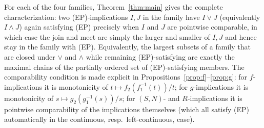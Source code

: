 \documentclass{amsart}
\theoremstyle{plain}
\theoremstyle{definition}
\begin{document}
For each of the four families, Theorem~\ref{thm:main} gives the complete characterization:
two (EP)-implications $I,J$ in the family have $I\vee J$ (equivalently $I\wedge J$) again
satisfying (EP) precisely when $I$ and $J$ are pointwise comparable, in which case the
join and meet are simply the larger and smaller of $I,J$ and hence stay in the family with
(EP). Equivalently, the largest subsets of a family that are closed under $\vee$ and
$\wedge$ while remaining (EP)-satisfying are exactly the maximal chains of the partially
ordered set of (EP)-satisfying members. The comparability condition is made explicit in
Propositions~\ref{prop:f}--\ref{prop:g}: for $f$-implications it is monotonicity of
$t\mapsto f_2(f_1^{-1}(t))/t$; for $g$-implications it is monotonicity of
$s\mapsto g_2(g_1^{-1}(s))/s$; for $(S,N)$- and $R$-implications it is pointwise
comparability of the implications themselves (which all satisfy (EP) automatically in the
continuous, resp.\ left-continuous, case).
\end{document}
